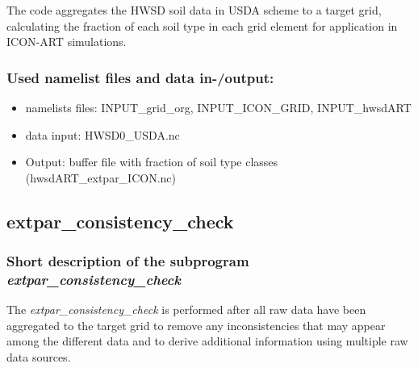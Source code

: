 \documentclass[a4paper,10pt,DIV14,BCOR1cm,titlepage,twoside]{scrartcl}
\begin{document}
The code aggregates the HWSD soil data in USDA scheme to a target grid,
calculating the fraction of each soil type in each grid element for
application in ICON-ART simulations.

\subsubsection{Used namelist files and data in-/output:}
\begin{itemize}
\item namelists files: INPUT\_grid\_org, INPUT\_ICON\_GRID, INPUT\_hwsdART
 \item data input: HWSD0\_USDA.nc
 \item Output: buffer file with fraction of soil type classes (hwsdART\_extpar\_ICON.nc)
\end{itemize}


\subsection{extpar\_consistency\_check}\label{extpar_consistency_check}
\subsubsection{Short description of the subprogram \textit{extpar\_consistency\_check}}
The \textit{extpar\_consistency\_check} is performed after all raw data have been aggregated to the target grid to remove any inconsistencies that may appear among the different data and to derive additional information using multiple raw data sources.\par\medskip\noindent
\end{document}
